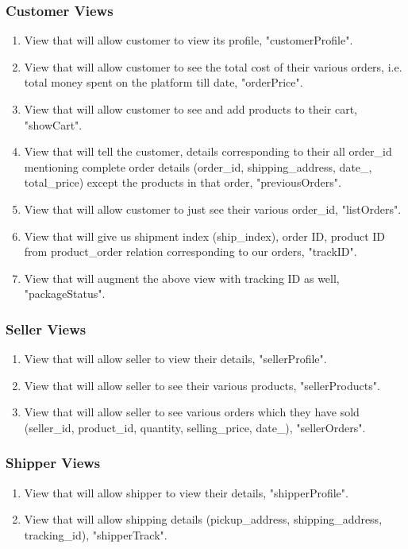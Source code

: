 \documentclass[a4paper,12pt]{article}
\begin{document}
\subsubsection{Customer Views}
\begin{enumerate}
  \item View that will allow customer to view its profile, "customerProfile".
  \item View that will allow customer to see the total cost of their various orders, i.e. total money spent on the platform till date, "orderPrice". 
  \item View that will allow customer to see and add products to their cart, "showCart".
  \item View that will tell the customer, details corresponding to their all order\_id mentioning complete order details (order\_id, shipping\_address, date\_, total\_price) except the products in that order, "previousOrders". 
  \item View that will allow customer to just see their various order\_id, "listOrders". 
  \item View that will give us shipment index (ship\_index), order ID, product ID from product\_order relation corresponding to our orders, "trackID".
  \item View that will augment the above view with tracking ID as well, "packageStatus".
\end{enumerate}
\subsubsection{Seller Views}
\begin{enumerate}
  \item View that will allow seller to view their details, "sellerProfile".
  \item View that will allow seller to see their various products, "sellerProducts".
  \item View that will allow seller to see various orders which they have sold (seller\_id, product\_id, quantity, selling\_price, date\_), "sellerOrders".
\end{enumerate}
\subsubsection{Shipper Views}
\begin{enumerate}
  \item View that will allow shipper to view their details, "shipperProfile".
  \item View that will allow shipping details (pickup\_address, shipping\_address, tracking\_id), "shipperTrack".
\end{enumerate}
\end{document}
